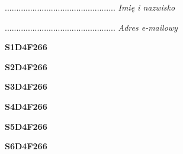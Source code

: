 \begin{turn}{90}\begin{minipage}{\linewidth} \vspace{20mm} ................................................  \textit{Imię i nazwisko}\end{minipage}\end{turn}

\begin{turn}{90}\begin{minipage}{\linewidth} \vspace{20mm} ................................................  \textit{Adres e-mailowy}\end{minipage}\end{turn}

\begin{turn}{90}\huge \begin{minipage}{\linewidth} \vspace{10mm}\textbf{S1D4F266}\end{minipage}\end{turn}

\begin{turn}{90}\huge \begin{minipage}{\linewidth} \vspace{10mm}\textbf{S2D4F266}\end{minipage}\end{turn}

\begin{turn}{90}\huge \begin{minipage}{\linewidth} \vspace{10mm}\textbf{S3D4F266}\end{minipage}\end{turn}

\begin{turn}{90}\huge \begin{minipage}{\linewidth} \vspace{10mm}\textbf{S4D4F266}\end{minipage}\end{turn}

\begin{turn}{90}\huge \begin{minipage}{\linewidth} \vspace{10mm}\textbf{S5D4F266}\end{minipage}\end{turn}

\begin{turn}{90}\huge \begin{minipage}{\linewidth} \vspace{10mm}\textbf{S6D4F266}\end{minipage}\end{turn}

